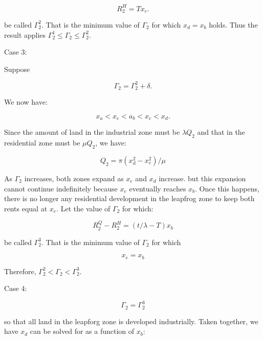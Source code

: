 \begin{equation*}
    R_2^H = Tx_c.
\end{equation*}

be called $\Gamma_2^2$. That is the minimum value of $\Gamma_2$ for which $x_d = x_b$ holds. Thus the result applies $\Gamma_2^1 \leq \Gamma_2 \leq \Gamma_2^2$.

Case 3:

Suppose

\begin{equation*}
    \Gamma_2 = \Gamma_2^2 + \delta.
\end{equation*}

We now have:

\begin{equation*}
    x_a < x_e < a_b < x_c < x_d.
\end{equation*}

Since the amount of land in the industrial zone must be $\lambda Q_2$ and that in the residential zone must be $\mu Q_2$, we have:

\begin{equation}
    Q_2 = \pi (x_d^2 - x_e^2) / \mu
\end{equation}

As $\Gamma_2$ increases, both zones expand as $x_e$ and $x_d$ increase. but this expansion cannot continue indefinitely because $x_e$ eventually reaches $x_b$. Once this happens, there is no longer any residential development in the leapfrog zone to keep both rents equal at $x_e$. Let the value of $\Gamma_2$ for which:

\begin{equation*}
    R_2^Q - R_2^H = (t / \lambda - T)x_b
\end{equation*}

be called $\Gamma_2^3$. That is the minimum value of $\Gamma_2$ for which

\begin{equation}
    x_e = x_b
\end{equation}

Therefore, $\Gamma_2^2 < \Gamma_2 < \Gamma_2^3$.

Case 4:

\begin{equation*}
    \Gamma_2 = \Gamma_2^3
\end{equation*}

so that all land in the leapforg zone is developed industrially. Taken together, we have $x_d$ can be solved for as a function of $x_b$:

